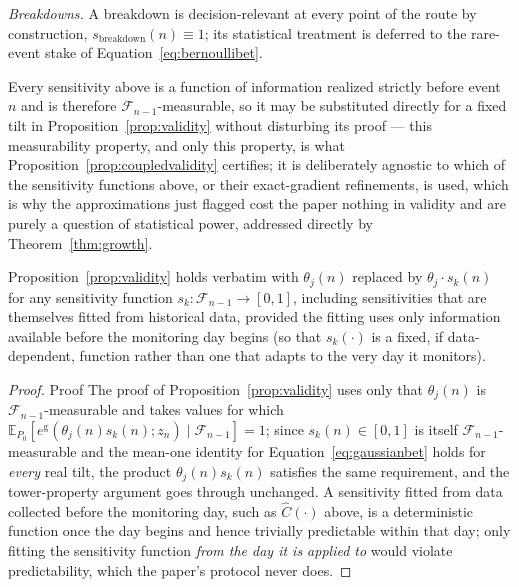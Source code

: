 \documentclass[trsc,dblanonrev]{informs4}
\newcommand{\E}{\mathbb{E}}
\newcommand{\F}{\mathcal{F}}
\begin{document}
\emph{Breakdowns.} A breakdown is decision-relevant at every point of
the route by construction, $s_{\mathrm{breakdown}}(n) \equiv 1$; its
statistical treatment is deferred to the rare-event stake of
Equation~\eqref{eq:bernoullibet}.

Every sensitivity above is a function of information realized strictly
before event $n$ and is therefore $\F_{n-1}$-measurable, so it may be
substituted directly for a fixed tilt in Proposition~\ref{prop:validity}
without disturbing its proof --- this measurability property, and only
this property, is what Proposition~\ref{prop:coupledvalidity} certifies;
it is deliberately agnostic to which of the sensitivity functions above,
or their exact-gradient refinements, is used, which is why the
approximations just flagged cost the paper nothing in validity and are
purely a question of statistical power, addressed directly by
Theorem~\ref{thm:growth}.

\begin{proposition}\label{prop:coupledvalidity}
Proposition~\ref{prop:validity} holds verbatim with $\theta_j(n)$
replaced by $\theta_j \cdot s_k(n)$ for any sensitivity function $s_k :
\F_{n-1} \to [0,1]$, including sensitivities that are themselves fitted
from historical data, provided the fitting uses only information
available before the monitoring day begins (so that $s_k(\cdot)$ is a
fixed, if data-dependent, function rather than one that adapts to the
very day it monitors).
\end{proposition}

\begin{proof}{Proof}
The proof of Proposition~\ref{prop:validity} uses only that
$\theta_j(n)$ is $\F_{n-1}$-measurable and takes values for which
$\E_{P_0}[e^{\mathrm g}(\theta_j(n) s_k(n); z_n) \mid \F_{n-1}] = 1$;
since $s_k(n) \in [0,1]$ is itself $\F_{n-1}$-measurable and the
mean-one identity for Equation~\eqref{eq:gaussianbet} holds for
\emph{every} real tilt, the product $\theta_j(n) s_k(n)$ satisfies the
same requirement, and the tower-property argument goes through
unchanged. A sensitivity fitted from data collected before the
monitoring day, such as $\widehat C(\cdot)$ above, is a deterministic
function once the day begins and hence trivially predictable within
that day; only fitting the sensitivity function \emph{from the day it
is applied to} would violate predictability, which the paper's
protocol never does. \Halmos
\end{proof}
\end{document}
